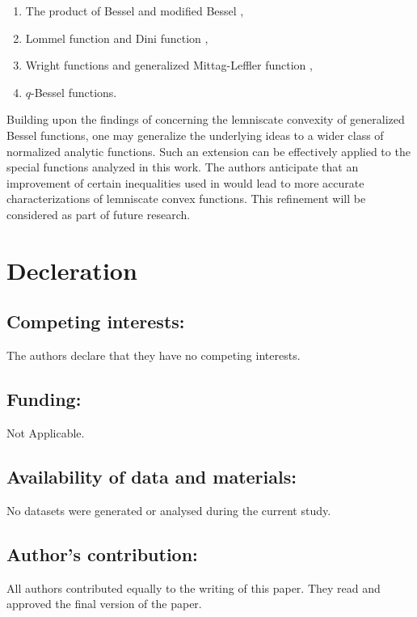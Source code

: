 \documentclass[a4paper,11pt,reqno]{amsart}
\begin{document}
\begin{enumerate}
    \item The product of Bessel and modified Bessel \cite{Baricz-product-Bessel},

\item Lommel function \cite{MR3596935} and Dini function \cite{Baricz-Deniz-Dini},
\item Wright functions  \cite{JKP-2, Das} and generalized Mittag-Leffler function \cite{Baricz-Anuja}, 
\item $q$-Bessel functions\cite{qb-Baricz1}.
\end{enumerate}

Building upon the findings of \cite{Zayed-Bulboacua} concerning the lemniscate convexity of generalized Bessel functions, one may generalize the underlying ideas to a wider class of normalized analytic functions. Such an extension can be effectively applied to the special functions analyzed in this work. The authors anticipate that an improvement of certain inequalities used in \cite{Zayed-Bulboacua} would lead to more accurate characterizations of lemniscate convex functions. This refinement will be considered as part of future research. 

\section*{Decleration}
\subsection*{Competing interests:} {The authors declare that they have no competing interests.}
\subsection*{Funding:} {Not Applicable.}
\subsection*{Availability of data and materials:} {No datasets were generated or analysed during the current study.}
\subsection*{Author's contribution:} {All authors contributed equally to the writing of this paper. They read and approved the final version of the paper.}




\end{document}
